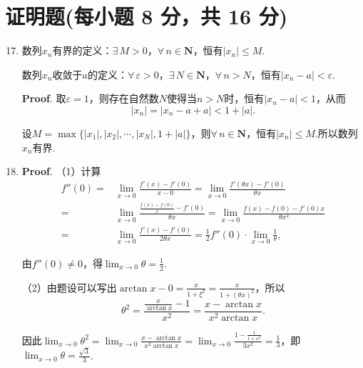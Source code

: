 \documentclass[../Main.tex]{subfiles}
\begin{document}
\section{证明题(每小题 8 分，共 16 分)}
\begin{enumerate}
    \setcounter{enumi}{16}
    \item 数列$x_{n}$有界的定义：$\exists\,M>0$，$\forall\,n\in\mathbf{N}$，恒有$|
              x_{n}|\leq M$.

          数列$x_{n}$收敛于$a$的定义：$\forall\,\varepsilon>0$，$\exists\,N\in\mathbf{N}$，$\forall
              \,n>N$，恒有$|x_{n}-a|<\varepsilon$.

          \textbf{Proof}. 取$\varepsilon=1$，则存在自然数$N$使得当$n>N$时，恒有$|x_{n}
              -a|<1$，从而
          \[
              |x_{n}|=|x_{n}-a+a|<1+|a|.
          \]

          设$M=\max\{|x_{1}|,|x_{2}|,\cdots,|x_{N}|,1+|a|\}$，则$\forall\,n\in\mathbf{N}$，恒有$|
              x_{n}|\leq M$.所以数列$x_{n}$有界.

    \item \textbf{Proof}. （1）计算
          \[
              \begin{aligned}
                  f''(0)= & \lim_{x\to0}\frac{f'(x)-f'(0)}{x-0}= \lim_{x\to0}\frac{f'(\theta x)-f'(0)}{\theta x}                    \\
                  =       & \lim_{x\to0}\frac{\frac{f(x)-f(0)}{x}-f'(0)}{\theta x}= \lim_{x\to0}\frac{f(x)-f(0)-f'(0)x}{\theta x^2} \\
                  =       & \lim_{x\to0}\frac{f'(x)-f'(0)}{2\theta x}= \frac{1}{2}f''(0)\cdot\lim_{x\to0}\frac{1}{\theta},
              \end{aligned}
          \]

          由$f''(0)\neq0$，得$\lim_{x\to0}\theta=\frac{1}{2}$.

          （2）由题设可以写出$\arctan x-0=\frac{x}{1+\xi^{2}}=\frac{x}{1+(\theta x)^{2}}$，所以
          \[
              \theta^{2} = \frac{\frac{x}{\arctan x}-1}{x^{2}}= \frac{x-\arctan x}{x^{2}\arctan
                  x}.
          \]

          因此$\lim_{x\to0}\theta^{2}=\lim_{x\to0}\frac{x-\arctan x}{x^{2}\arctan x}=
              \lim_{x\to0}\frac{1-\frac{1}{1+x^{2}}}{3x^{2}}=\frac{1}{3}$，即$\lim_{x\to0}
              \theta=\frac{\sqrt{3}}{3}$.
\end{enumerate}
\end{document}
